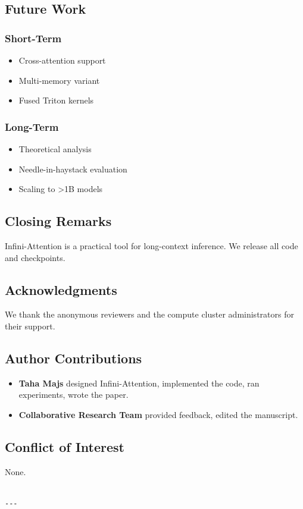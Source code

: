 \subsection{Future Work}

\subsubsection{Short-Term}
\begin{itemize}
\item Cross-attention support
\item Multi-memory variant
\item Fused Triton kernels

\end{itemize}
\subsubsection{Long-Term}
\begin{itemize}
\item Theoretical analysis
\item Needle-in-haystack evaluation
\item Scaling to >1B models

\end{itemize}
\subsection{Closing Remarks}

Infini-Attention is a practical tool for long-context inference. We release 
all code and checkpoints.

\subsection{Acknowledgments}

We thank the anonymous reviewers and the compute cluster administrators for their support.

\subsection{Author Contributions}

\begin{itemize}
\item \textbf{Taha Majs} designed Infini-Attention, implemented the code, ran
  experiments, wrote the paper.
\item \textbf{Collaborative Research Team} provided feedback, edited the manuscript.

\end{itemize}
\subsection{Conflict of Interest}

None.
\begin{lstlisting}

---
\end{lstlisting}
